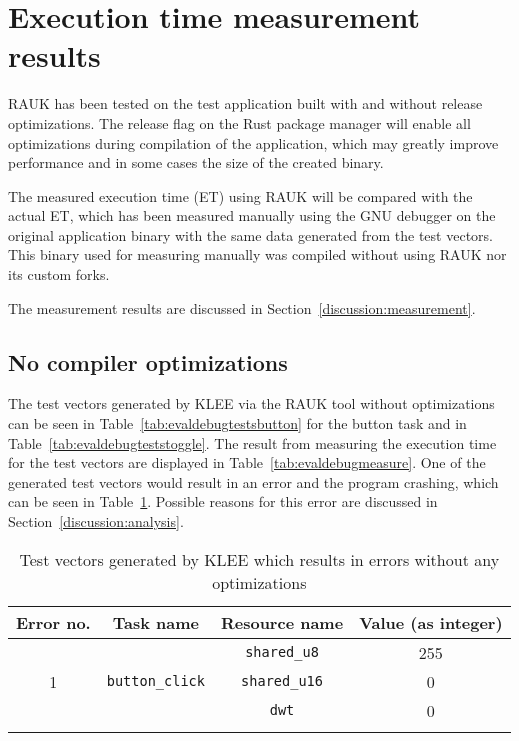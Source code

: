 

\section{Execution time measurement results}
RAUK has been tested on the test application built with and without release
optimizations. The release flag on the Rust package manager will enable all
optimizations during compilation of the application, which may greatly improve
performance and in some cases the size of the created binary.

The measured execution time (ET) using RAUK will be compared with the actual
ET\@, which has been measured manually using the GNU debugger on the original
application binary with the same data generated from the test vectors. This
binary used for measuring manually was compiled without using RAUK nor its
custom forks.

The measurement results are discussed in Section~\ref{discussion:measurement}.

\subsection{No compiler optimizations}
The test vectors generated by KLEE via the RAUK tool without optimizations can
be seen in Table~\ref{tab:evaldebugtestsbutton} for the button task and in
Table~\ref{tab:evaldebugteststoggle}. The result from measuring the execution
time for the test vectors are displayed in Table~\ref{tab:evaldebugmeasure}.
One of the generated test vectors would result in an error and the program
crashing, which can be seen in Table~\ref{tab:evaldebugtestsbuttonerror}. Possible
reasons for this error are discussed in Section~\ref{discussion:analysis}.

\begin{longtable}{|c|c|c|c|}
\hline
Error no. & Task name & Resource name & Value (as integer) \\ \hline
\multirow{3}{*}{1} & \multirow{3}{*}{\texttt{button\_click}} & \texttt{shared\_u8}  & 255 \\ \cline{3-4}
                   &                                         & \texttt{shared\_u16} & 0 \\ \cline{3-4}
                   &                                         & \texttt{dwt}         & 0 \\ \hline
\caption{Test vectors generated by KLEE which results in errors without any optimizations}
\label{tab:evaldebugtestsbuttonerror}
\end{longtable}

